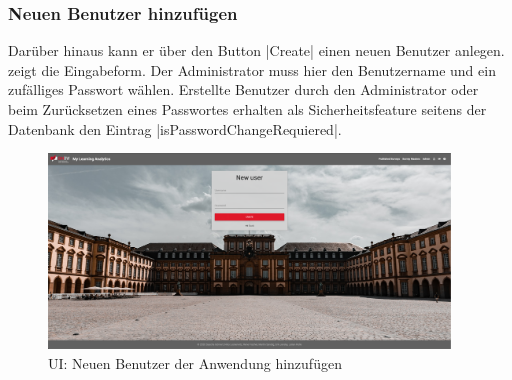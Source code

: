 \subsubsection*{Neuen Benutzer hinzufügen \faUsers}

Darüber hinaus kann er über den Button \jinline|Create| einen neuen Benutzer anlegen. 
\abb {} zeigt die Eingabeform. 
Der Administrator muss hier den Benutzername und ein zufälliges Passwort wählen. 
Erstellte Benutzer durch den Administrator oder beim Zurücksetzen eines Passwortes erhalten als Sicherheitsfeature seitens der Datenbank  den Eintrag \jinline|isPasswordChangeRequiered|. 

\begin{figure}[hp]
	\centering
	\includegraphics[width=0.95\textwidth, keepaspectratio]{img/client/AdminCreateUser.png}
	\captionsetup{justification=centering, format=plain}
	\caption[\acf{UI}: Neuen Benutzer der Anwendung hinzufügen]{\acf{UI}: Neuen Benutzer der Anwendung hinzufügen \\ \quelleScreenshot}
	\label{fig:AdminCreateUserImplement}
\end{figure}

